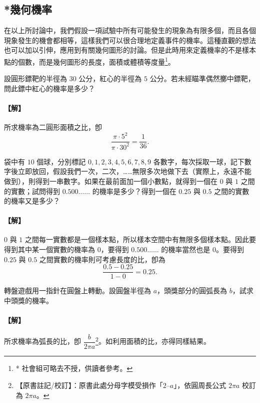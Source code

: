 \subsection{*幾何機率}\label{sec:b5-3-3}

在以上所討論中，我們假設一項試驗中所有可能發生的現象為有限多個，而且各個現象發生的機會都相等，這樣我們可以很合理地定義事件的機率。這種直觀的想法也可以加以引伸，應用到有關幾何圖形的討論。但是此時用來定義機率的不是樣本點的個數，而是幾何圖形的長度，面積或體積等度量\footnote{* 社會組可略去不授，供讀者參考。}。

\medskip
\begin{example}\label{ex:b5-3-9}
設圓形鏢靶的半徑為 $30$ 公分，紅心的半徑為 $5$ 公分。若未經瞄準偶然擲中鏢靶，問此鏢中紅心的機率是多少？
\end{example}
\paragraph{【解】}
所求機率為二圓形面積之比，卽
\[
\frac{\pi \cdot 5^2}{\pi \cdot 30^2} = \frac{1}{36}. \tag*{\#}
\]

\medskip
\begin{example}\label{ex:b5-3-10}
袋中有 $10$ 個球，分別標記 $0, 1, 2, 3, 4, 5, 6, 7, 8, 9$ 各數字，每次採取一球，記下數字後立即放回，假設我們一次，二次，……無限多次地做下去（實際上，永遠不能做到），則得到一串數字。如果在最前面加一個小數點，就得到一個在 $0$ 與 $1$ 之間的實數；試問得到 $0.500\dots\dots$ 的機率是多少？得到一個在 $0.25$ 與 $0.5$ 之間的實數的機率又是多少？
\end{example}
\paragraph{【解】}
$0$ 與 $1$ 之間每一實數都是一個樣本點，所以樣本空間中有無限多個樣本點。因此要得到其中某一個實數的機率為 $0$，要得到 $0.500\dots\dots$ 的機率當然也是 $0$。要得到 $0.25$ 與 $0.5$ 之間實數的機率則可考慮長度的比，卽為
\[
\frac{0.5 - 0.25}{1 - 0} = 0.25.
\]

\medskip
\begin{example}\label{ex:b5-3-11}
轉盤遊戲用一指針在圓盤上轉動。設圓盤半徑為 $a$，頭獎部分的圓弧長為 $b$，試求中頭獎的機率。
\end{example}
\paragraph{【解】}
所求機率為弧長的比，卽 $\dfrac{b}{2\pi a}$\label{note:b5-ch3-p111-2pia}\footnote{【原書註記/校訂】：原書此處分母字模受損作「$2\text{--}a$」，依圓周長公式 $2\pi a$ 校訂為 $2\pi a$。}。如利用面積的比，亦得同樣結果。


